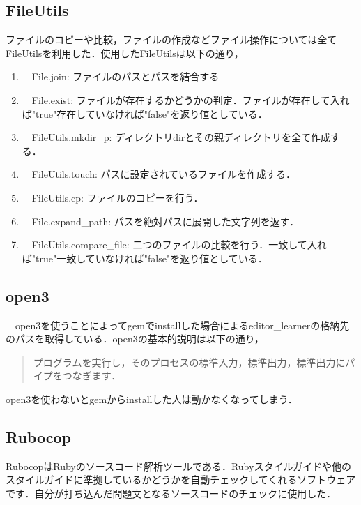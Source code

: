     \subsection{FileUtils}\label{fileutils}

ファイルのコピーや比較，ファイルの作成などファイル操作については全てFileUtilsを利用した．使用したFileUtilsは以下の通り，

\begin{enumerate}
\def\labelenumi{\arabic{enumi}.}
\tightlist
\item
　File.join: ファイルのパスとパスを結合する
\item
　File.exist: ファイルが存在するかどうかの判定．ファイルが存在して入れば"true"存在していなければ"false"を返り値としている．
\item
　FileUtils.mkdir\_p: ディレクトリdirとその親ディレクトリを全て作成する．
\item
　FileUtils.touch: パスに設定されているファイルを作成する．
\item
　FileUtils.cp: ファイルのコピーを行う．
\item
　File.expand\_path: パスを絶対パスに展開した文字列を返す．
\item
　FileUtils.compare\_file: 二つのファイルの比較を行う．一致して入れば"true"一致していなければ"false"を返り値としている．
\end{enumerate}


    \subsection{open3}\label{open3}

　open3を使うことによってgemでinstallした場合によるeditor\_learnerの格納先のパスを取得している．open3の基本的説明は以下の通り，
\begin{quotation}
プログラムを実行し，そのプロセスの標準入力，標準出力，標準出力にパイプをつなぎます． \cite{open3}
\end{quotation}
open3を使わないとgemからinstallした人は動かなくなってしまう．


    \subsection{Rubocop}\label{rubocop}

RubocopはRubyのソースコード解析ツールである．Rubyスタイルガイドや他のスタイルガイドに準拠しているかどうかを自動チェックしてくれるソフトウェアです．自分が打ち込んだ問題文となるソースコードのチェックに使用した．
